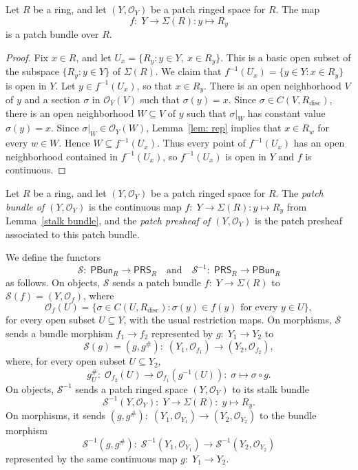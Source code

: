 \documentclass[11pt]{amsart}
\def\O{{\mathcal{O}}}
\begin{document}
\begin{lemma}\label{stalk bundle} Let $R$ be a ring, and let $(Y,\mathcal O_Y)$ be a patch ringed space for $R$.
The map $$f\colon\; Y \longrightarrow \Sigma(R) : y\longmapsto R_y$$ is a patch bundle over $R$.
\end{lemma}
\begin{proof} { Fix $x\in R$, and let $U_x=\{R_y:y\in Y,\ x\in R_y\}.$}
This is a basic open subset of the subspace $\{R_y:y \in Y\}$ of $\Sigma(R)$. We claim that $f^{-1}({ U_x}) = \{y \in Y:x \in R_y\}$  is open in $Y$.   
Let $y \in f^{-1}({ U_x})$, so that $x\in R_y$. There is  an open neighborhood $V$ of $y$
and a section $\sigma$ in $\O_Y(V)$ such that $\sigma(y) =x$. 
Since $\sigma \in C(V,R_{\mathrm{disc}})$, there is an open neighborhood $W \subseteq V$ of $y$ such that $\sigma|_W$ has constant value $\sigma(y) =x$.
Since $\sigma|_W\in\mathcal O_Y(W)$, Lemma~\ref{lem: rep} implies that $x\in R_w$ for every $w \in W$. Hence
$W\subseteq f^{-1}({ U_x}).$
Thus every point of $f^{-1}({ U_x})$ has an open neighborhood contained in
$f^{-1}({ U_x})$, so $f^{-1}({ U_x})$ is open in $Y$ and $f$ is continuous. 
\end{proof}

\begin{definition} Let $R$ be a ring, and let $(Y,\mathcal O_Y)$ be a patch ringed space for $R$.
The {\it patch bundle of $(Y,\mathcal O_Y)$} is the continuous map $f\colon\; Y \rightarrow \Sigma(R) : y\longmapsto R_y$ from Lemma~\ref{stalk bundle}, and the {\it patch presheaf of $(Y,\mathcal O_Y)$} is the patch presheaf associated to this patch bundle. 
\end{definition}


\begin{definition}\label{def: bundle ringed functors}
We define the functors
\[
\mathcal S\colon\; \mathsf{PBun}_R\longrightarrow\mathsf{PRS}_R
\quad\text{and}\quad
\mathcal S^{-1}\colon\; \mathsf{PRS}_R\longrightarrow\mathsf{PBun}_R
\]
as follows.
On objects, $\mathcal S$ sends a patch bundle $f\colon\; Y\to\Sigma(R)$ to $\mathcal S(f)=(Y,\mathcal O_f)$, where
$$\mathcal O_f(U)=\{\sigma\in C(U,R_{\mathrm{disc}}):
\sigma(y)\in f(y)\text{ for every }y\in U\},
$$
for every open subset $U\subseteq Y$, with the usual restriction maps.
On morphisms, $\mathcal S$ sends a bundle morphism $f_1\to f_2$ represented by $g\colon\; Y_1\to Y_2$ to
\[
\mathcal S(g)=(g,g^\#)\colon\; (Y_1,\mathcal O_{f_1})\longrightarrow(Y_2,\mathcal O_{f_2}),
\]
where, for every open subset $U\subseteq Y_2$, 
\[
g^\#_U\colon\; \mathcal O_{f_2}(U)\longrightarrow\mathcal O_{f_1}(g^{-1}(U))\colon\; \sigma\longmapsto\sigma\circ g.
\]
On objects, $\mathcal S^{-1}$ sends a patch ringed space $(Y,\mathcal O_Y)$ to its stalk bundle
\[
\mathcal S^{-1}(Y,\mathcal O_Y)\colon\;
Y\longrightarrow\Sigma(R)\colon\; y\longmapsto R_y.
\]
On morphisms, it sends
$(g,g^\#)\colon\; (Y_1,\mathcal O_{Y_1})\to(Y_2,\mathcal O_{Y_2})$
to the bundle morphism
\[
\mathcal S^{-1}(g,g^\#)\colon\; \mathcal S^{-1}(Y_1,\mathcal O_{Y_1})
\longrightarrow\mathcal S^{-1}(Y_2,\mathcal O_{Y_2})
\]
represented by the same continuous map $g\colon\; Y_1\to Y_2$.
\end{definition}
\end{document}
